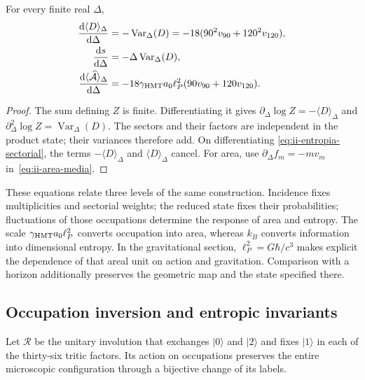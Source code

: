 \begin{proposition}
For every finite real $\Delta$,
\begin{align}
 \frac{\mathrm d\langle D\rangle_\Delta}{\mathrm d\Delta}
 &=-\operatorname{Var}_\Delta(D)
   =-18(90^2v_{90}+120^2v_{120}),\\
 \frac{\mathrm d s}{\mathrm d\Delta}
 &=-\Delta\operatorname{Var}_\Delta(D),
 \label{eq:ii-respuesta-entropica}\\
 \frac{\mathrm d\langle\widehat{\mathcal A}\rangle_\Delta}{\mathrm d\Delta}
 &=-18\gamma_{\mathrm{HMT}}a_0\ell_P^2(90v_{90}+120v_{120}).
 \label{eq:ii-respuesta-areal}
\end{align}
\end{proposition}
\begin{proof}
The sum defining $Z$ is finite. Differentiating it gives
$\partial_\Delta\log Z=-\langle D\rangle_\Delta$ and
$\partial_\Delta^2\log Z=\operatorname{Var}_\Delta(D)$.
The sectors and their factors are independent in the product state;
their variances therefore add. On differentiating
\eqref{eq:ii-entropia-sectorial}, the terms
$-\langle D\rangle_\Delta$ and $\langle D\rangle_\Delta$
cancel. For area, use
$\partial_\Delta f_m=-mv_m$ in~\eqref{eq:ii-area-media}.
\end{proof}

These equations relate three levels of the same construction.
Incidence fixes multiplicities and sectorial weights; the
reduced state fixes their probabilities; fluctuations of those
occupations determine the response of area and entropy.
The scale $\gamma_{\mathrm{HMT}}a_0\ell_P^2$ converts occupation into area,
whereas $k_B$ converts information into dimensional entropy.
In the gravitational section, $\ell_P^2=G\hbar/c^3$ makes explicit
the dependence of that areal unit on action and gravitation.
Comparison with a horizon additionally preserves the geometric
map and the state specified there.

\subsection{Occupation inversion and entropic invariants}
\label{sec:ii-inversion-sectorial}

Let $\mathcal R$ be the unitary involution that exchanges $|0\rangle$
and $|2\rangle$ and fixes $|1\rangle$ in each of the thirty-six
tritic factors. Its action on occupations preserves the entire
microscopic configuration through a bijective change of its labels.

